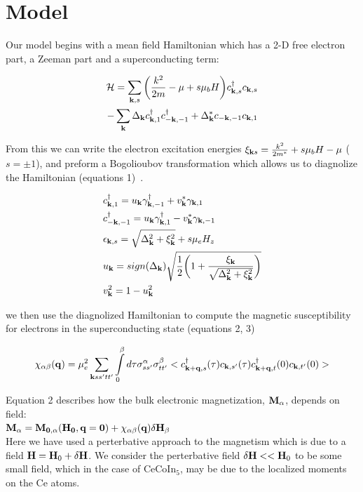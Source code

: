 \documentclass[usletter,aps,prb,10pt,amssymb,amsmath,twocolumn]{revtex4-1}
\begin{document}
\section{Model}
Our model begins with a mean field Hamiltonian which has a 2-D free electron part, a Zeeman part and a superconducting term:

\begin{align*}
\mathcal{H} = \sum_{{\bf k},s} \bigg(\frac{k^2}{2m} - \mu + s\mu_b H\bigg)c_{{\bf k},s}^\dagger c_{{\bf k},s}  \\
- \sum_{\bf k} \Delta_{\bf k} c_{{\bf k},1}^\dagger c_{-{\bf k},-1}^\dagger+\Delta^*_{\bf k} c_{-{\bf k},-1} c_{{\bf k},1}
\end{align*}

From this we can write the electron excitation energies $\xi_{{\bf k}s}=\frac{k^2}{2m^*}+s\mu_b H-\mu$ ($s=\pm1 $), and preform a Bogolioubov transformation which allows us to diagnolize the Hamiltonian (equations 1)~\cite{tinkham}.

\begin{subequations}
\begin{align}
&c^{\dagger}_{{\bf k}, 1}=u_{{\bf k}}\gamma^\dagger_{{\bf k}, -1}+v^*_{{\bf k}}\gamma_{{\bf k}, 1}  \\
&c^{\dagger}_{-{\bf k}, -1}=u_{{\bf k}}\gamma^\dagger_{{\bf k}, 1}-v^*_{{\bf k}}\gamma_{{\bf k}, -1}  \\
&\epsilon_{{\bf k},s}=\sqrt{\Delta_{{\bf k}}^2+\xi_{{\bf k}}^2} + s\mu_e H_z \\
&u_{{\bf k}}=sign(\Delta_{\bf k}) \sqrt{\frac{1}{2}\bigg(1+\frac{\xi_{{\bf k}}}{\sqrt{\Delta_{{\bf k}}^2+\xi_{{\bf k}}^2}}\bigg)} \\
&v_{{\bf k}}^2=1-u_{{\bf k}}^2 
\end{align}
\end{subequations}

we then use the diagnolized Hamiltonian to compute the magnetic susceptibility for electrons in the superconducting state (equations 2, 3)~\cite{mahan}

{\fontsize{5}{0}\selectfont
\begin{align}
\chi_{\alpha\beta}({\bf q})=\mu_e^2\sum\limits_{{\bf k}ss'tt'}\int\limits_0^{\beta}d\tau\sigma^\alpha_{ss'}\sigma^\beta_{tt'}<c^\dagger_{{\bf k+q}, s}(\tau)c_{{\bf k}, s'}(\tau)c^\dagger_{{\bf k+q}, t}(0)c_{{\bf k}, t'}(0)> 
\end{align}
}

Equation 2 describes how the bulk electronic magnetization, $\bf M_{\alpha}$, depends on field:\\
$\bf M_{\alpha}=M_{0,\alpha}({\bf H}_0, {\bf q} = 0)+\chi_{\alpha\beta}({\bf q}) \delta H_\beta$ \\
Here we have used a perterbative approach to the magnetism which is due to a field ${\bf  H = H}_0+\delta{\bf H}$. We consider the perterbative field $\delta{\bf H}<<{\bf H}_0$ to be some small field, which in the case of CeCoIn$_5$, may be due to the localized moments on the Ce atoms.
\end{document}
